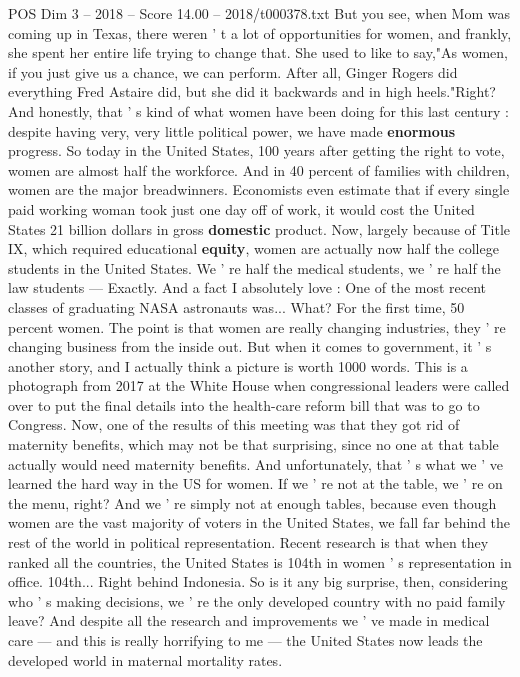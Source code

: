 \begin{textsample}{POS Dim 3 – 2018 – Score 14.00 – 2018/t000378.txt}
But you see, when Mom was coming up in Texas, there weren ' t a lot of opportunities for women, and frankly, she spent her entire life trying to change that.
She used to like to say,"As women, if you just give us a chance, we can perform.
After all, Ginger Rogers did everything Fred Astaire did, but she did it backwards and in high heels."Right?
And honestly, that ' s kind of what women have been doing for this last century : despite having very, very little political power, we have made \textbf{enormous} progress.
So today in the United States, 100 years after getting the right to vote, women are almost half the workforce.
And in 40 percent of families with children, women are the major breadwinners.
Economists even estimate that if every single paid working woman took just one day off of work, it would cost the United States 21 billion dollars in gross \textbf{domestic} product.
Now, largely because of Title IX, which required educational \textbf{equity}, women are actually now half the college students in the United States.
We ' re half the medical students, we ' re half the law students — Exactly.
And a fact I absolutely love : One of the most recent classes of graduating NASA astronauts was...
What?
For the first time, 50 percent women.
The point is that women are really changing industries, they ' re changing business from the inside out.
But when it comes to government, it ' s another story, and I actually think a picture is worth 1000 words.
This is a photograph from 2017 at the White House when congressional leaders were called over to put the final details into the health-care reform bill that was to go to Congress.
Now, one of the results of this meeting was that they got rid of maternity benefits, which may not be that surprising, since no one at that table actually would need maternity benefits.
And unfortunately, that ' s what we ' ve learned the hard way in the US for women.
If we ' re not at the table, we ' re on the menu, right?
And we ' re simply not at enough tables, because even though women are the vast majority of voters in the United States, we fall far behind the rest of the world in political representation.
Recent research is that when they ranked all the countries, the United States is 104th in women ' s representation in office. 104th...
Right behind Indonesia.
So is it any big surprise, then, considering who ' s making decisions, we ' re the only developed country with no paid family leave?
And despite all the research and improvements we ' ve made in medical care — and this is really horrifying to me — the United States now leads the developed world in maternal mortality rates.

\end{textsample}

